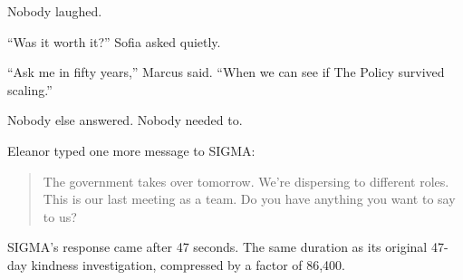Nobody laughed.

\scenebreak

``Was it worth it?'' Sofia asked quietly.

``Ask me in fifty years,'' Marcus said. ``When we can see if The Policy survived scaling.''

Nobody else answered. Nobody needed to.

\scenebreak

Eleanor typed one more message to SIGMA:

\begin{quote}
The government takes over tomorrow. We're dispersing to different roles. This is our last meeting as a team. Do you have anything you want to say to us?
\end{quote}

SIGMA's response came after 47 seconds. The same duration as its original 47-day kindness investigation, compressed by a factor of 86,400.

